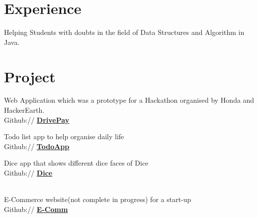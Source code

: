 \documentclass[]{deedy-resume-openfont}
\begin{document}
\begin{minipage}[t]{0.66\textwidth} 


\section{Experience}
\vspace{\topsep} %
\begin{tightemize}
\item Helping Students with doubts in the field of Data Structures and Algorithm in Java.

\end{tightemize}
\sectionsep




\section{Project}
Web Application which was a prototype for a Hackathon organised by Honda and HackerEarth.\\  
Github:// \href{https://github.com/Digvijay-Singh-Dhanker/DrivePay-1}{\bf DrivePay} \\
\sectionsep

Todo list app to help organise daily life\\
Github:// \href{https://github.com/Digvijay-Singh-Dhanker/todoList}{\bf TodoApp} \\
\sectionsep

Dice app that shows different dice faces of Dice\\
Github:// \href{https://github.com/Digvijay-Singh-Dhanker/DiceFlutter}{\bf Dice} \\
\

E-Commerce website(not complete in progress) for a start-up\\
Github:// \href{https://github.com/Digvijay-Singh-Dhanker/alhaiyaah-website}{\bf E-Comm} \\
\sectionsep


\end{minipage}
\end{document}
